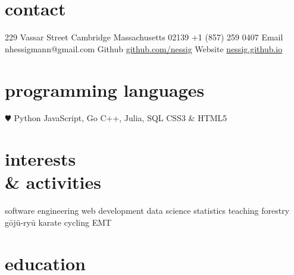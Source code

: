 \documentclass[11pt]{friggeri-cv} %
\begin{document}


\begin{aside} %
\section{contact}
229 Vassar Street
Cambridge
Massachusetts 02139
+1 (857) 259 0407
{{\FA \faEnvelope} Email}
{\footnotesize nhessigmann@gmail.com}
{{\FA \faGithub} Github}
{\footnotesize \href{http://github.com/nessig}{github.com/nessig}}
{{\FA \faHome} Website}
{\footnotesize \href{https://nessig.github.io}{ nessig.github.io}}
\section{programming languages}
{\color{red} $\varheartsuit$} Python
JavaScript, Go
C++, Julia, SQL
CSS3 \& HTML5
\section{interests\\ \& activities}
software engineering
web development
data science
statistics
teaching
forestry
g\={o}j\={u}-ry\={u} karate
cycling
EMT
\end{aside}


\section{education}
\end{document}
